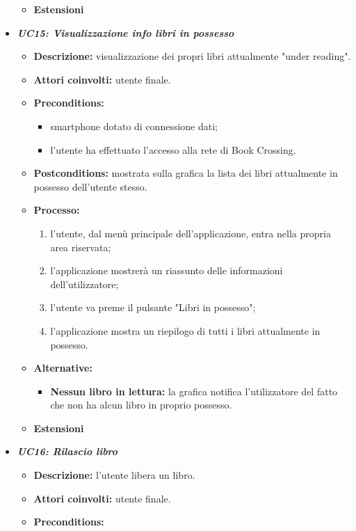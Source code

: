 \begin{itemize}
\begin{itemize}
\begin{itemize}
		\end{itemize}
		\item \textbf{Estensioni}
	\end{itemize}
	\item \textbf{\textit{UC15: Visualizzazione info libri in possesso}}
	\begin{itemize}
		\item \textbf{Descrizione:} visualizzazione dei propri libri attualmente "under reading".
		\item \textbf{Attori coinvolti:}  utente finale.
		\item \textbf{Preconditions:}
		\begin{itemize}
			\item smartphone dotato di connessione dati;
			\item l’utente ha effettuato l’accesso alla rete di Book Crossing.
		\end{itemize}
		\item \textbf{Postconditions:} mostrata sulla grafica la lista dei libri attualmente in possesso dell'utente stesso. 
		\item \textbf{Processo:}
		\begin{enumerate}
			\item l'utente, dal menù principale dell'applicazione, entra nella propria area riservata;
			\item l'applicazione mostrerà un riassunto delle informazioni dell'utilizzatore;
			\item l'utente va preme il pulsante "Libri in possesso";
			\item l'applicazione mostra un riepilogo di tutti i libri attualmente in possesso.
		\end{enumerate}
		\item \textbf{Alternative:}
		\begin{itemize}
			\item \textbf{Nessun libro in lettura:} la grafica notifica l'utilizzatore del fatto che non ha alcun libro in proprio possesso.
		\end{itemize}
		\item \textbf{Estensioni}
	\end{itemize}
	\item \textbf{\textit{UC16: Rilascio libro}}
	\begin{itemize}
		\item \textbf{Descrizione:} l'utente libera un libro.
		\item \textbf{Attori coinvolti:} utente finale.
		\item \textbf{Preconditions:}

\end{itemize}
\end{itemize}
